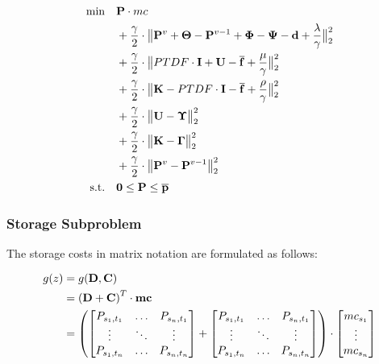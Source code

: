  \begin{subequations}
	\begin{align}
		 \min \quad & \vb{P} \cdot mc \\
		 & + \frac{\gamma}{2} \cdot \big\| \vb{P}^v + \vb{\Theta} - \vb{P}^{v-1} + \vb{\Phi} - \vb{\Psi} - \vb{d} + \frac{\vb{\lambda}}{\gamma} \big\|^2_2 \\
		 & + \frac{\gamma}{2} \cdot \big\| PTDF \cdot \vb{I} + \vb{U} - \vb{\overline{f}} + \frac{\vb{\mu}}{\gamma}\big\|^2_2 \nonumber \\
		 & + \frac{\gamma}{2} \cdot \big\| \vb{K} - PTDF \cdot \vb{I} - \vb{\overline{f}} + \frac{\vb{\rho}}{\gamma}\big\|^2_2 \nonumber \\
		 & + \frac{\gamma}{2} \cdot \big\| \vb{U} - \vb{\Upsilon}  \big\|^2_2 \nonumber\\
		 & + \frac{\gamma}{2} \cdot \big\| \vb{K} - \vb{\Gamma} \big\|^2_2 \nonumber \\
		 & + \frac{\gamma}{2} \cdot \big\| \vb{P}^v - \vb{P}^{v-1} \big\|^2_2 \nonumber \\
		 \text{s.t.} \quad & \vb{0} \leq \vb{P} \leq \vb{\overline{p}}
	\end{align}
\end{subequations}

\subsubsection*{Storage Subproblem}

The storage costs in matrix notation are formulated as follows:

\begin{subequations}
	\begin{align}
		g(z) &= g(\vb{D}, \vb{C})\\
		& = \left(\vb{D} + \vb{C}\right)^T \cdot \vb{mc} \\
		& = \left(\begin{bmatrix}
			P_{s_1,t_1} & \dots & P_{s_n,t_1} \\
			\vdots & \ddots & \vdots \\
			P_{s_1,t_n} & \dots & P_{s_n,t_n}
		\end{bmatrix} + \begin{bmatrix}
			P_{s_1,t_1} & \dots & P_{s_n,t_1} \\
			\vdots & \ddots & \vdots \\
			P_{s_1,t_n} & \dots & P_{s_n,t_n}
		\end{bmatrix} \right) \cdot \begin{bmatrix}
			mc_{s_1} \\
			\vdots \\
			mc_{s_n}
		\end{bmatrix}
	\end{align}
\end{subequations}

